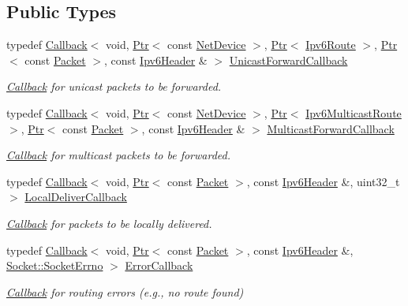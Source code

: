 \subsection*{Public Types}
\begin{DoxyCompactItemize}
\item 
typedef \hyperlink{classns3_1_1Callback}{Callback}$<$ void, \hyperlink{classns3_1_1Ptr}{Ptr}$<$ const \hyperlink{classns3_1_1NetDevice}{Net\+Device} $>$, \hyperlink{classns3_1_1Ptr}{Ptr}$<$ \hyperlink{classns3_1_1Ipv6Route}{Ipv6\+Route} $>$, \hyperlink{classns3_1_1Ptr}{Ptr}$<$ const \hyperlink{classns3_1_1Packet}{Packet} $>$, const \hyperlink{classns3_1_1Ipv6Header}{Ipv6\+Header} \& $>$ \hyperlink{classns3_1_1Ipv6RoutingProtocol_a579fd6755ee873009819f7117371fea7}{Unicast\+Forward\+Callback}
\begin{DoxyCompactList}\small\item\em \hyperlink{classns3_1_1Callback}{Callback} for unicast packets to be forwarded. \end{DoxyCompactList}\item 
typedef \hyperlink{classns3_1_1Callback}{Callback}$<$ void, \hyperlink{classns3_1_1Ptr}{Ptr}$<$ const \hyperlink{classns3_1_1NetDevice}{Net\+Device} $>$, \hyperlink{classns3_1_1Ptr}{Ptr}$<$ \hyperlink{classns3_1_1Ipv6MulticastRoute}{Ipv6\+Multicast\+Route} $>$, \hyperlink{classns3_1_1Ptr}{Ptr}$<$ const \hyperlink{classns3_1_1Packet}{Packet} $>$, const \hyperlink{classns3_1_1Ipv6Header}{Ipv6\+Header} \& $>$ \hyperlink{classns3_1_1Ipv6RoutingProtocol_a5f12e04512ce8e5808c3cceff6b8918f}{Multicast\+Forward\+Callback}
\begin{DoxyCompactList}\small\item\em \hyperlink{classns3_1_1Callback}{Callback} for multicast packets to be forwarded. \end{DoxyCompactList}\item 
typedef \hyperlink{classns3_1_1Callback}{Callback}$<$ void, \hyperlink{classns3_1_1Ptr}{Ptr}$<$ const \hyperlink{classns3_1_1Packet}{Packet} $>$, const \hyperlink{classns3_1_1Ipv6Header}{Ipv6\+Header} \&, uint32\+\_\+t $>$ \hyperlink{classns3_1_1Ipv6RoutingProtocol_a93f6c06be1e024747e95f4299eba74a6}{Local\+Deliver\+Callback}
\begin{DoxyCompactList}\small\item\em \hyperlink{classns3_1_1Callback}{Callback} for packets to be locally delivered. \end{DoxyCompactList}\item 
typedef \hyperlink{classns3_1_1Callback}{Callback}$<$ void, \hyperlink{classns3_1_1Ptr}{Ptr}$<$ const \hyperlink{classns3_1_1Packet}{Packet} $>$, const \hyperlink{classns3_1_1Ipv6Header}{Ipv6\+Header} \&, \hyperlink{classns3_1_1Socket_ada1328c5ae0c28cb2a982caf8f6d6cca}{Socket\+::\+Socket\+Errno} $>$ \hyperlink{classns3_1_1Ipv6RoutingProtocol_abfdf43594e2ae97e1a4dc340e3a086a5}{Error\+Callback}
\begin{DoxyCompactList}\small\item\em \hyperlink{classns3_1_1Callback}{Callback} for routing errors (e.\+g., no route found) \end{DoxyCompactList}\end{DoxyCompactItemize}
